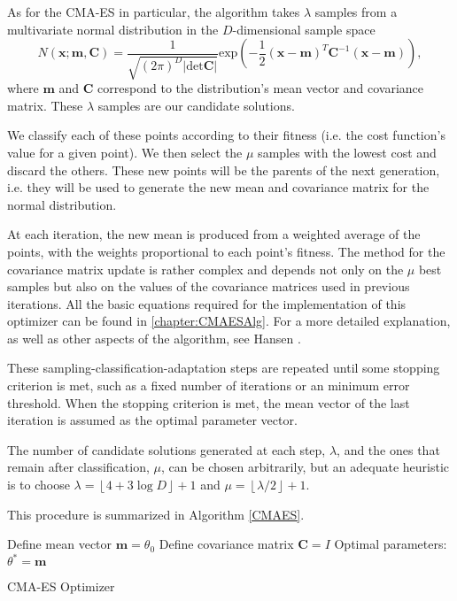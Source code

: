 As for the CMA-ES in particular, the algorithm takes $\lambda$ samples from a multivariate normal distribution in the $D$-dimensional sample space
\begin{equation}
N(\mathbf{x;m,C})=\frac{1}{\sqrt{(2\pi)^D|\mathrm{det}\mathbf{C}|}}\mathrm{exp}\left(-\frac{1}{2}(\mathbf{x}-\mathbf{m})^T\mathbf{C}^{-1}(\mathbf{x}-\mathbf{m})\right),
\end{equation}
\noindent where $\mathbf{m}$ and $\mathbf{C}$ correspond to the distribution's mean vector and covariance matrix.
These $\lambda$ samples are our candidate solutions.

We classify each of these points according to their fitness (i.e. the cost function's value for a given point). We then select the $\mu$ samples with the lowest cost and discard the others. These new points will be the parents of the next generation, i.e. they will be used to generate the new mean and covariance matrix for the normal distribution.



At each iteration, the new mean is produced from a weighted average of the points, with the weights proportional to each point's fitness.
The method for the covariance matrix update is rather complex and depends not only on the $\mu$ best samples but also on the values of the covariance matrices used in previous iterations. All the basic equations required for the implementation of this optimizer can be found in \autoref{chapter:CMAESAlg}. For a more detailed explanation, as well as other aspects of the algorithm, see Hansen \citep{Hansen}.

These sampling-classification-adaptation steps are repeated until some stopping criterion is met, such as a fixed number of iterations or an minimum error threshold.
When the stopping criterion is met, the mean vector of the last iteration is assumed as the optimal parameter vector.


The number of candidate solutions generated at each step, $\lambda$, and the ones that remain after classification, $\mu$, can be chosen arbitrarily, but an adequate heuristic is to choose $\lambda=\left\lfloor4+3\log D\right\rfloor+1$ and $\mu=\left\lfloor\lambda/2\right\rfloor+1$.

This procedure is summarized in Algorithm \ref{CMAES}.

\begin{algorithm}[H]\label{CMAES}
\DontPrintSemicolon
Define mean vector $\mathbf{m}=\theta_0$
Define covariance matrix $\mathbf{C}=I$\;
 Optimal parameters: $\theta^{*}=\mathbf{m}$\;
 \caption{CMA-ES Optimizer}
\end{algorithm}
\

